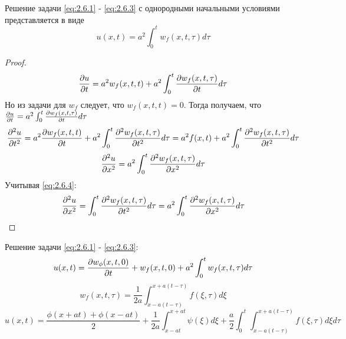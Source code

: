 \documentclass[../main.tex]{subfiles}
\begin{document}
\begin{theorem}
    Решение задачи  \eqref{eq:2.6.1} -  \eqref{eq:2.6.3} с однородными начальными условиями представляется в виде
    \begin{equation}
        u(x, t) = a^2\int_0^tw_f(x, t, \tau)d\tau
    \end{equation}
\end{theorem}
\begin{proof}
   $$ 
   \frac{\partial u}{\partial t}=a^2w_f(x, t, t) + a^2 \int_0^t\frac{\partial w_f(x,t,\tau)}{\partial t}d\tau
   $$
   Но из задачи для $w_f$ следует, что $w_f(x, t, t) = 0$. Тогда получаем, что 
   $ \frac{\partial u}{\partial t} = a^2\int_0^t\frac{\partial w_f(x, t, \tau)}{\partial t}d\tau$
   $$
   \frac{\partial ^2u}{\partial t^2}=a^2\frac{\partial w_f(x, t, t)}{\partial t} + a^2\int_0^t\frac{\partial ^2w_f(x, t, \tau)}{\partial t^2}d\tau =
   a^2f(x, t) + a^2\int_0^t\frac{\partial ^2w_f(x, t, \tau)}{\partial t^2}d\tau
   $$
   $$
   \frac{\partial ^2u}{\partial x^2} = a^2\int_0^t\frac{\partial ^2w_f(x, t, \tau)}{\partial x^2}d\tau
   $$
   Учитывая \eqref{eq:2.6.4}:
   $$
   \frac{\partial ^2u}{\partial x^2} = \int_0^t\frac{\partial ^2w_f(x, t, \tau)}{\partial t^2}d\tau =  a^2\int_0^t\frac{\partial ^2w_f(x, t, \tau)}{\partial x^2}d\tau
   $$

\end{proof}
Решение задачи \eqref{eq:2.6.1} - \eqref{eq:2.6.3}:
$$
u(x, t) = \frac{\partial w_\phi(x, t, 0)}{\partial t} + w_f(x, t, 0) + a^2\int_0^tw_f(x, t, \tau)d\tau
$$
$$
w_f(x, t, \tau)=\frac{1}{2a}\int_{x - a(t-\tau)}^{x+a(t-\tau)}f(\xi, \tau)d\xi
$$
$$
u(x, t) = \frac{\phi(x + at) + \phi(x - at)}{2} + \frac{1}{2a}\int_{x - at}^{x + at}\psi(\xi)d\xi + \frac{a}{2}\int_0^{t}\int_{x - a(t - \tau)}^{x + a(t - \tau)}f(\xi,\tau)d\xi d\tau
$$
\end{document}
